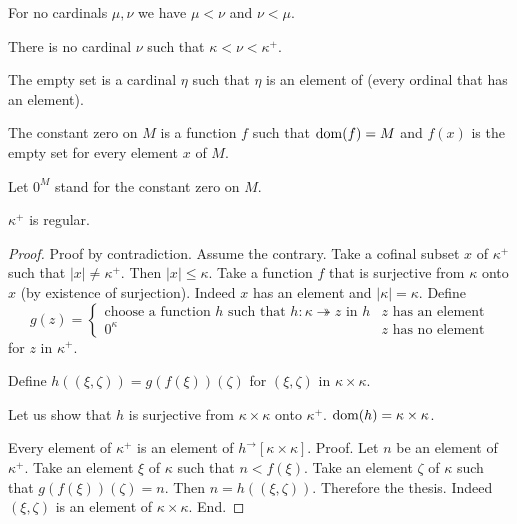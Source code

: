 \documentclass{article}
\newcommand{\Prod}[2]{#1\times #2}
\newcommand{\Succ}[1]{#1^{+}}
\newcommand{\image}[2]{#1^{\to}[#2]}
\newcommand{\card}[1]{\left|#1\right|}
\newcommand{\surjects}{\twoheadrightarrow}
\begin{document}
\begin{forthel}
    \begin{axiom}
      For no cardinals $\mu, \nu$ we have $\mu < \nu$ and $\nu < \mu$.
    \end{axiom}

    \begin{axiom}
      There is no cardinal $\nu$ such that $\kappa < \nu < \Succ{\kappa}$.
    \end{axiom}

    \begin{definition}
      The empty set is a cardinal $\eta$ such that $\eta$
      is an element of (every ordinal that has an element).
    \end{definition}

    \begin{definition}
      The constant zero on $M$ is a function $f$ such that $\operatorname{dom}(f) = M$ and $f(x)$ is the empty set for every element $x$ of $M$.
    \end{definition}

    Let $0^M$ stand for the constant zero on $M$.

    \begin{theorem}
      $\Succ{\kappa}$ is regular.
    \end{theorem}
    \begin{proof}
      Proof by contradiction. Assume the contrary.
      Take a cofinal subset $x$ of $\Succ{\kappa}$ such that $\card{x} \neq \Succ{\kappa}$.
      Then $\card{x} \leq \kappa$.
      Take a function $f$ that is surjective from $\kappa$ onto $x$ (by existence of surjection).
      Indeed $x$ has an element and $\card{\kappa} = \kappa$.
      Define
      $$
        g(z) =
          \begin{cases}
            \text{choose a function $h$ such that $h : \kappa \surjects z$ in $h$}
            & \text{$z$ has an element}
            \\
            \text{$0^\kappa$}
            & \text{$z$ has no element}
          \end{cases}
      $$
      for $z$ in $\Succ{\kappa}$.

      Define $h((\xi,\zeta)) = g(f(\xi))(\zeta)$ for $(\xi,\zeta)$ in $\Prod{\kappa}{\kappa}$.

      Let us show that $h$ is surjective from $\Prod{\kappa}{\kappa}$ onto $\Succ{\kappa}$.
      $\dom(h) = \Prod{\kappa}{\kappa}$.

        Every element of $\Succ{\kappa}$ is an element of $\image{h}{\Prod{\kappa}{\kappa}}$.
        Proof.
          Let $n$ be an element of $\Succ{\kappa}$.
          Take an element $\xi$ of $\kappa$ such that $n < f(\xi)$.
          Take an element $\zeta$ of $\kappa$ such that $g(f(\xi))(\zeta) = n$.
          Then $n = h((\xi,\zeta))$.
          Therefore the thesis.
          Indeed $(\xi,\zeta)$ is an element of $\Prod{\kappa}{\kappa}$.
        End.


\end{proof}
\end{forthel}
\end{document}
